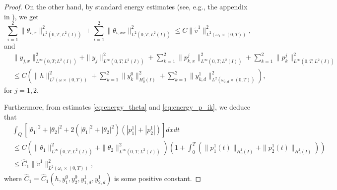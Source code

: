 \documentclass[11pt,a4paper]{amsart}
\numberwithin{equation}{section}
\begin{document}
\begin{proof}
    \noindent On the other hand, by standard energy estimates (see, e.g., the appendix in \cite{GYL-Carleman-2025}), we get \begin{equation}\label{eq:energy_theta}
	    \sum_{i=1}^2 \|\theta_{i,x}\|^2_{L^2(0,T;L^2(I))} + \sum_{i=1}^2 	\|\theta_{i,xx}\|^2_{L^2(0,T;L^2(I))} \leq C \|\widetilde{v}^1\|^2_{L^2(\omega_1\times (0,T))},
    \end{equation}and
\begin{equation}\label{eq:energy_p_ik}
\begin{split}
	       &\| y_{j,x}\|^2_{L^\infty(0,T;L^2(I))} + \|y_j\|^2_{L^\infty(0,T;L^2(I))} +
           \sum_{k=1}^2 \| p_{k,x}^j\|^2_{L^\infty(0,T;L^2(I))} + \sum_{k=1}^2 	\|p_k^j\|^2_{L^\infty(0,T;L^2(I))} \\
           & \leq C \left( \|h\|^2_{L^2(\omega \times (0,T))} + \sum_{k=1}^2 \|y_k^0\|^2_{H_0^1(I)} + \sum_{k=1}^2 \|y_{k,d}^1\|_{L^2(\omega_{i,d}\times (0,T))}^2 \right),
        \end{split}
    \end{equation}for $j=1,2$.
    
    Furthermore, from estimates \eqref{eq:energy_theta} and \eqref{eq:energy_p_ik}, we deduce that
\begin{equation}\label{eq:est_v1_3}
\begin{split}
&\int_{Q} \left[ |\theta_1|^2 + |\theta_2|^2 +  2(|\theta_1|^2+|\theta_2|^2)(|p_1^1|+|p_2^1|) \right] dxdt \\
& \leq C\left(\|\theta_1\|_{L^\infty(0,T;L^2(I))}^{2} + \|\theta_2\|_{L^\infty(0,T;L^2(I))}^{2}\right) %
            \left( 1 +  \int_0^T \left(\|p_1^1(t)\|_{H^1_0(I)} + \|p_2^1(t)\|_{H^1_0(I)} \right) \right) \\
            & \leq \widehat{C}_1 \|\widetilde{v}^1\|^2_{L^2(\omega_1\times (0,T))},
\end{split}
\end{equation}where $\widehat{C}_1= \widehat{C}_1\left( h, y^0_1, y^0_2, y^1_{1, d}, y^1_{2, d}\right)$ is some positive constant.


\end{proof}
\end{document}
